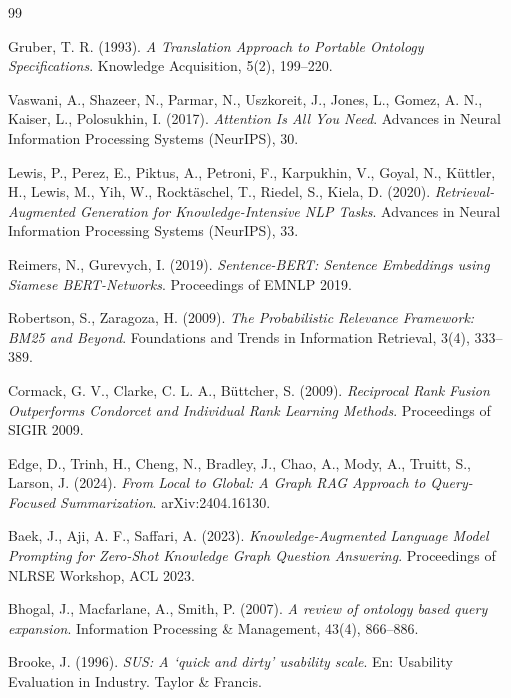 \documentclass[12pt, a4paper, twoside]{report}
\begin{document}
\begin{thebibliography}{99}

Gruber, T. R. (1993).
\textit{A Translation Approach to Portable Ontology Specifications}.
Knowledge Acquisition, 5(2), 199--220.

Vaswani, A., Shazeer, N., Parmar, N., Uszkoreit, J., Jones, L., Gomez, A. N., Kaiser, L., Polosukhin, I. (2017).
\textit{Attention Is All You Need}.
Advances in Neural Information Processing Systems (NeurIPS), 30.

Lewis, P., Perez, E., Piktus, A., Petroni, F., Karpukhin, V., Goyal, N., K\"uttler, H., Lewis, M., Yih, W., Rockt\"aschel, T., Riedel, S., Kiela, D. (2020).
\textit{Retrieval-Augmented Generation for Knowledge-Intensive NLP Tasks}.
Advances in Neural Information Processing Systems (NeurIPS), 33.

Reimers, N., Gurevych, I. (2019).
\textit{Sentence-BERT: Sentence Embeddings using Siamese BERT-Networks}.
Proceedings of EMNLP 2019.

Robertson, S., Zaragoza, H. (2009).
\textit{The Probabilistic Relevance Framework: BM25 and Beyond}.
Foundations and Trends in Information Retrieval, 3(4), 333--389.

Cormack, G. V., Clarke, C. L. A., B\"uttcher, S. (2009).
\textit{Reciprocal Rank Fusion Outperforms Condorcet and Individual Rank Learning Methods}.
Proceedings of SIGIR 2009.

Edge, D., Trinh, H., Cheng, N., Bradley, J., Chao, A., Mody, A., Truitt, S., Larson, J. (2024).
\textit{From Local to Global: A Graph RAG Approach to Query-Focused Summarization}.
arXiv:2404.16130.

Baek, J., Aji, A. F., Saffari, A. (2023).
\textit{Knowledge-Augmented Language Model Prompting for Zero-Shot Knowledge Graph Question Answering}.
Proceedings of NLRSE Workshop, ACL 2023.

Bhogal, J., Macfarlane, A., Smith, P. (2007).
\textit{A review of ontology based query expansion}.
Information Processing \& Management, 43(4), 866--886.

Brooke, J. (1996).
\textit{SUS: A `quick and dirty' usability scale}.
En: Usability Evaluation in Industry. Taylor \& Francis.


\end{thebibliography}
\end{document}
